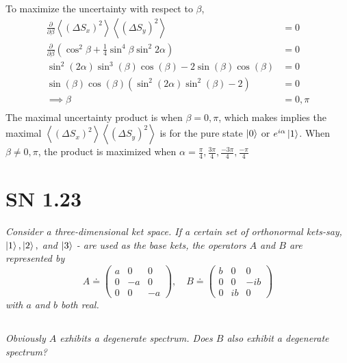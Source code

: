 \documentclass{article}
\begin{document}
To maximize the uncertainty with respect to $\beta$, 
\begin{align*}
    \frac{\partial}{\partial \beta} \left\langle\left(\Delta S_{x}\right)^{2}\right\rangle\left\langle\left(\Delta S_{y}\right)^{2}\right\rangle &= 0\\
     \frac{\partial}{\partial \beta} \left(\cos ^{2} \beta+\frac{1}{4} \sin ^{4} \beta \sin ^{2} 2  \alpha\right) &= 0\\
     \sin ^2(2 \alpha ) \sin ^3(\beta ) \cos (\beta )-2 \sin (\beta ) \cos (\beta ) &= 0\\
     \sin (\beta ) \cos (\beta ) \left(\sin ^2(2 \alpha ) \sin ^2(\beta )-2\right)&=0\\
     \implies \beta &= 0, \pi\\
\end{align*}
 The maximal uncertainty product is when $\beta = 0,\pi$, which makes implies the maximal $\left\langle\left(\Delta S_{x}\right)^{2}\right\rangle\left\langle\left(\Delta S_{y}\right)^{2}\right\rangle$ is for the pure state $\ket{0}$ or $e^{i \alpha}\ket{1}$. When $\beta \neq 0,\pi$, the product is maximized when $\alpha = \frac{\pi}{4},\frac{3\pi}{4},\frac{-3\pi}{4},\frac{-\pi}{4}$


\newpage

\section{SN 1.23} 
\textit{Consider a three-dimensional ket space. If a certain set of orthonormal kets-say, $\ket{1},\ket{2},$ and $\ket{3}$ - are used as the base kets, the operators $A$ and $B$ are represented by
$$
A \doteq\left(\begin{array}{ccc}
a & 0 & 0 \\
0 & -a & 0 \\
0 & 0 & -a
\end{array}\right), \quad B \doteq\left(\begin{array}{ccc}
b & 0 & 0 \\
0 & 0 & -i b \\
0 & i b & 0
\end{array}\right)
$$ with $a$ and $b$ both real.}

\subsection{}
\textit{Obviously $A$ exhibits a degenerate spectrum. Does $B$ also exhibit a degenerate spectrum?}
\end{document}
